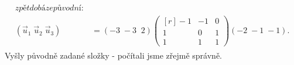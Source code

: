 \begin{mdframed}[style=mdexam]
\begin{example}
\begin{gather*}
\begin{aligned}
{                        zpět do báze původní:}   \\
        (\vec{u}_1\; \vec{u}_2\;  \vec{u}_3) &= (-3\; -3\;\; 2)
        \begin{pmatrix*}[r]
          -1 & -1 &  0 \\
           1 &  0 &  1 \\
           1 &  1 &  1
        \end{pmatrix*} 
        (-2\; -1\; -1).   
      \end{aligned}  
    \end{gather*}  
    Vyšly původně zadané složky - počítali jsme zřejmě správně.
    \endgroup
  \end{example}
\end{mdframed}